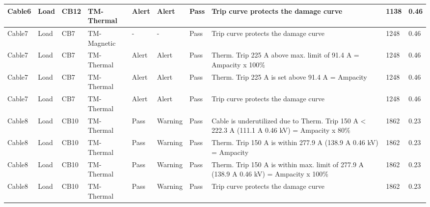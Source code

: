 \begin{table}[!htb]
{{\begin{tabular}{l|l|l|p{2cm}|p{1cm}|p{1cm}|p{1cm}|p{3cm}|p{2cm}|p{1cm}}
Cable6 & Load & CB12 & TM-Thermal & Alert & Alert & Pass & Trip curve protects the damage curve & 1138 & 0.46 \\ 
\hline
Cable7 & Load & CB7 & TM-Magnetic & - & - & Pass & Trip curve protects the damage curve & 1248 & 0.46 \\ 
Cable7 & Load & CB7 & TM-Thermal & Alert & Alert & Pass & Therm. Trip 225 A above max. limit of 91.4 A = Ampacity x 100\% & 1248 & 0.46 \\ 
Cable7 & Load & CB7 & TM-Thermal & Alert & Alert & Pass & Therm. Trip 225 A is set above 91.4 A = Ampacity & 1248 & 0.46 \\ 
Cable7 & Load & CB7 & TM-Thermal & Alert & Alert & Pass & Trip curve protects the damage curve & 1248 & 0.46 \\ 
\hline
Cable8 & Load & CB10 & TM-Thermal & Pass & Warning & Pass & Cable is underutilized due to Therm. Trip 150 A < 222.3 A (111.1 A \@ 0.46 kV) = Ampacity x 80\% & 1862 & 0.23 \\ 
Cable8 & Load & CB10 & TM-Thermal & Pass & Warning & Pass & Therm. Trip 150 A is within 277.9 A (138.9 A \@ 0.46 kV) = Ampacity & 1862 & 0.23 \\ 
Cable8 & Load & CB10 & TM-Thermal & Pass & Warning & Pass & Therm. Trip 150 A is within max. limit of 277.9 A (138.9 A \@ 0.46 kV) = Ampacity x 100\% & 1862 & 0.23 \\ 
Cable8 & Load & CB10 & TM-Thermal & Pass & Warning & Pass & Trip curve protects the damage curve & 1862 & 0.23 \\ 
\hline
	\end{tabular}	
		
	}
}
\end{table}

